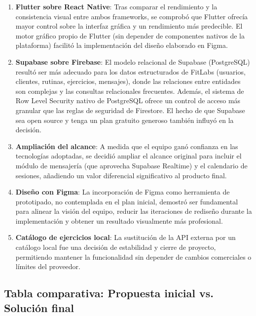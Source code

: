 \begin{enumerate}
  \item \textbf{Flutter sobre React Native}: Tras comparar el rendimiento y la consistencia visual entre ambos frameworks, se comprobó que Flutter ofrecía mayor control sobre la interfaz gráfica y un rendimiento más predecible. El motor gráfico propio de Flutter (sin depender de componentes nativos de la plataforma) facilitó la implementación del diseño elaborado en Figma.

  \item \textbf{Supabase sobre Firebase}: El modelo relacional de Supabase (PostgreSQL) resultó ser más adecuado para los datos estructurados de FitLabs (usuarios, clientes, rutinas, ejercicios, mensajes), donde las relaciones entre entidades son complejas y las consultas relacionales frecuentes. Además, el sistema de Row Level Security nativo de PostgreSQL ofrece un control de acceso más granular que las reglas de seguridad de Firestore. El hecho de que Supabase sea open source y tenga un plan gratuito generoso también influyó en la decisión.

  \item \textbf{Ampliación del alcance}: A medida que el equipo ganó confianza en las tecnologías adoptadas, se decidió ampliar el alcance original para incluir el módulo de mensajería (que aprovecha Supabase Realtime) y el calendario de sesiones, añadiendo un valor diferencial significativo al producto final.

  \item \textbf{Diseño con Figma}: La incorporación de Figma como herramienta de prototipado, no contemplada en el plan inicial, demostró ser fundamental para alinear la visión del equipo, reducir las iteraciones de rediseño durante la implementación y obtener un resultado visualmente más profesional.

  \item \textbf{Catálogo de ejercicios local}: La sustitución de la API externa por un catálogo local fue una decisión de estabilidad y cierre de proyecto, permitiendo mantener la funcionalidad sin depender de cambios comerciales o límites del proveedor.
\end{enumerate}

\subsection{Tabla comparativa: Propuesta inicial vs. Solución final}

